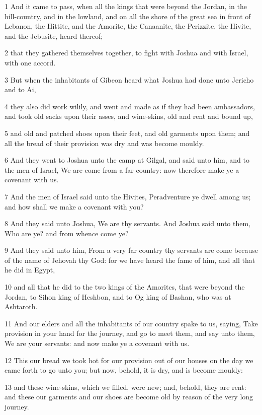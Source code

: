 \par 1 And it came to pass, when all the kings that were beyond the Jordan, in the hill-country, and in the lowland, and on all the shore of the great sea in front of Lebanon, the Hittite, and the Amorite, the Canaanite, the Perizzite, the Hivite, and the Jebusite, heard thereof;
\par 2 that they gathered themselves together, to fight with Joshua and with Israel, with one accord.
\par 3 But when the inhabitants of Gibeon heard what Joshua had done unto Jericho and to Ai,
\par 4 they also did work wilily, and went and made as if they had been ambassadors, and took old sacks upon their asses, and wine-skins, old and rent and bound up,
\par 5 and old and patched shoes upon their feet, and old garments upon them; and all the bread of their provision was dry and was become mouldy.
\par 6 And they went to Joshua unto the camp at Gilgal, and said unto him, and to the men of Israel, We are come from a far country: now therefore make ye a covenant with us.
\par 7 And the men of Israel said unto the Hivites, Peradventure ye dwell among us; and how shall we make a covenant with you?
\par 8 And they said unto Joshua, We are thy servants. And Joshua said unto them, Who are ye? and from whence come ye?
\par 9 And they said unto him, From a very far country thy servants are come because of the name of Jehovah thy God: for we have heard the fame of him, and all that he did in Egypt,
\par 10 and all that he did to the two kings of the Amorites, that were beyond the Jordan, to Sihon king of Heshbon, and to Og king of Bashan, who was at Ashtaroth.
\par 11 And our elders and all the inhabitants of our country spake to us, saying, Take provision in your hand for the journey, and go to meet them, and say unto them, We are your servants: and now make ye a covenant with us.
\par 12 This our bread we took hot for our provision out of our houses on the day we came forth to go unto you; but now, behold, it is dry, and is become mouldy:
\par 13 and these wine-skins, which we filled, were new; and, behold, they are rent: and these our garments and our shoes are become old by reason of the very long journey.
